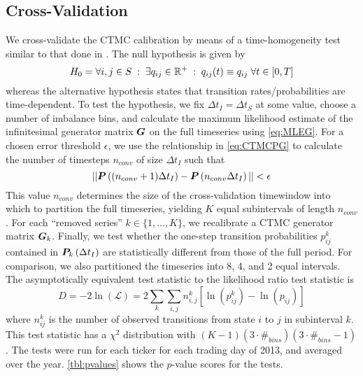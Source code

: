 \subsection{Cross-Validation}
We cross-validate the CTMC calibration by means of a time-homogeneity test similar to that done in \citet{Tan02}. The null hypothesis is given by \citep{Weiss10}
\begin{equation}
H_0 = \forall i,j \in S \; : \; \exists q_{ij} \in \mathbb{R}^+ \; : \; q_{ij}(t) \equiv q_{ij} \; \forall t \in [0,T]
\end{equation}
whereas the alternative hypothesis states that transition rates/probabilities are time-dependent. To test the hypothesis, we fix $\Delta t_I = \Delta t_S$ at some value, choose a number of imbalance bins, and calculate the maximum likelihood estimate of the infinitesimal generator matrix $\boldsymbol{G}$ on the full timeseries using \eqref{eq:MLEG}. For a chosen error threshold $\epsilon$, we use the relationship in \eqref{eq:CTMCPG} to calculate the number of timesteps $n_{conv}$ of size $\Delta t_I$ such that
\begin{equation}\label{eq:crossvalidnconv}
|| \boldsymbol{P}\left((n_{conv}+1)\Delta t_I \right) - \boldsymbol{P} \left( n_{conv}\Delta t_I \right) || < \epsilon
\end{equation}
This value $n_{conv}$ determines the size of the cross-validation timewindow into which to partition the full timeseries, yielding $K$ equal subintervals of length $n_{conv}$. For each ``removed series'' $k \in \{ 1,\dots,K \}$, we recalibrate a CTMC generator matrix $\boldsymbol{G}_{k}$. Finally, we test whether the one-step transition probabilities $p_{ij}^k$ contained in $\boldsymbol{P}_k \left(\Delta t_I \right)$ are statistically different from those of the full period. For comparison, we also partitioned the timeseries into 8, 4, and 2 equal intervals. The asymptotically equivalent test statistic to the likelihood ratio test statistic is
\begin{equation}
D = -2 \ln (\mathcal{L})  = 2 \sum_k \sum_{i,j} n_{i,j}^k \left[ \ln(p_{ij}^k)  - \ln(p_{ij})   \right]
\end{equation}
where $n_{ij}^k$ is the number of observed transitions from state $i$ to $j$ in subinterval $k$. This test statistic has a $\chi^2$ distribution with $(K-1)(3 \cdot \#_{bins})(3 \cdot \#_{bins} - 1)$. The tests were run for each ticker for each trading day of 2013, and averaged over the year. \autoref{tbl:pvalues} shows the $p$-value scores for the tests.
